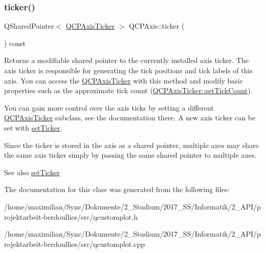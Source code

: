 \subsubsection{\texorpdfstring{ticker()}{ticker()}}
{\footnotesize\ttfamily Q\+Shared\+Pointer$<$ \hyperlink{class_q_c_p_axis_ticker}{Q\+C\+P\+Axis\+Ticker} $>$ Q\+C\+P\+Axis\+::ticker (\begin{DoxyParamCaption}{ }\end{DoxyParamCaption}) const\hspace{0.3cm}{\ttfamily [inline]}}

Returns a modifiable shared pointer to the currently installed axis ticker. The axis ticker is responsible for generating the tick positions and tick labels of this axis. You can access the \hyperlink{class_q_c_p_axis_ticker}{Q\+C\+P\+Axis\+Ticker} with this method and modify basic properties such as the approximate tick count (\hyperlink{class_q_c_p_axis_ticker_a47752abba8293e6dc18491501ae34008}{Q\+C\+P\+Axis\+Ticker\+::set\+Tick\+Count}).

You can gain more control over the axis ticks by setting a different \hyperlink{class_q_c_p_axis_ticker}{Q\+C\+P\+Axis\+Ticker} subclass, see the documentation there. A new axis ticker can be set with \hyperlink{class_q_c_p_axis_a4ee03fcd2c74d05cd1a419b9af5cfbdc}{set\+Ticker}.

Since the ticker is stored in the axis as a shared pointer, multiple axes may share the same axis ticker simply by passing the same shared pointer to multiple axes.

\begin{DoxySeeAlso}{See also}
\hyperlink{class_q_c_p_axis_a4ee03fcd2c74d05cd1a419b9af5cfbdc}{set\+Ticker} 
\end{DoxySeeAlso}


The documentation for this class was generated from the following files\+:\begin{DoxyCompactItemize}
\item 
/home/maximilian/\+Sync/\+Dokumente/2\+\_\+\+Studium/2017\+\_\+\+S\+S/\+Informatik/2\+\_\+\+A\+P\+I/projektarbeit-\/berdoullies/src/qcustomplot.\+h\item 
/home/maximilian/\+Sync/\+Dokumente/2\+\_\+\+Studium/2017\+\_\+\+S\+S/\+Informatik/2\+\_\+\+A\+P\+I/projektarbeit-\/berdoullies/src/qcustomplot.\+cpp\end{DoxyCompactItemize}
